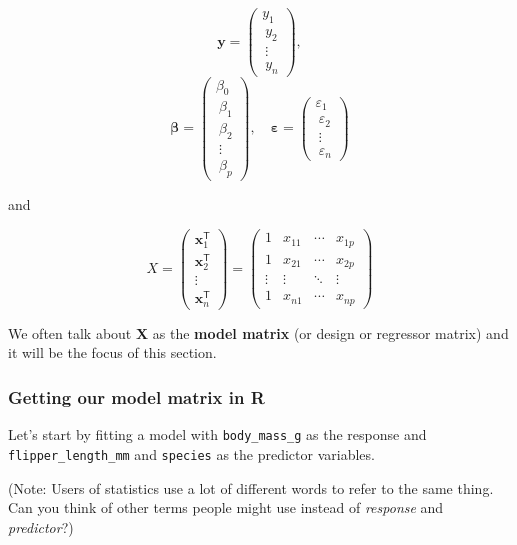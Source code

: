 \documentclass[
  openany]{book}
\begin{document}
\[
  \mathbf{y} = \begin{pmatrix} 
y_1 \\\ 
y_2 \\\ 
\vdots \\\ 
y_n 
\end{pmatrix} ,
\]
\[
  \boldsymbol\beta = \begin{pmatrix} \beta_0  \\\ \beta_1  \\\ \beta_2  \\\ \vdots  \\\ \beta_p \end{pmatrix}, \quad
\boldsymbol\varepsilon = \begin{pmatrix} \varepsilon_1  \\\ \varepsilon_2  \\\ \vdots  \\\ \varepsilon_n \end{pmatrix}
\]

and

\[X = \begin{pmatrix} \mathbf{x}^\mathsf{T}_1 \\ \mathbf{x}^\mathsf{T}_2 \\ \vdots \\ \mathbf{x}^\mathsf{T}_n \end{pmatrix}
= \begin{pmatrix} 1 &  x_{11} & \cdots & x_{1p} \\
1 & x_{21} & \cdots & x_{2p} \\
\vdots & \vdots & \ddots & \vdots \\
1 & x_{n1} & \cdots & x_{np}
\end{pmatrix}\]

We often talk about \textbf{X} as the \textbf{model matrix} (or design or regressor matrix) and it will be the focus of this section.

\hypertarget{getting-our-model-matrix-in-r}{%
\subsubsection{Getting our model matrix in R}\label{getting-our-model-matrix-in-r}}

Let's start by fitting a model with \texttt{body\_mass\_g} as the response and \texttt{flipper\_length\_mm} and \texttt{species} as the predictor variables.

(Note: Users of statistics use a lot of different words to refer to the same thing. Can you think of other terms people might use instead of \emph{response} and \emph{predictor}?)
\end{document}

